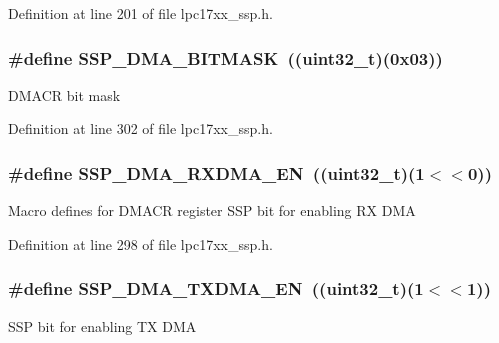 \-Definition at line 201 of file lpc17xx\-\_\-ssp.\-h.

\hypertarget{group___s_s_p___private___macros_ga7ba88e5e9bd61c60806ce262fcc8838a}{
\subsubsection[{\-S\-S\-P\-\_\-\-D\-M\-A\-\_\-\-B\-I\-T\-M\-A\-S\-K}]{\setlength{\rightskip}{0pt plus 5cm}\#define {\bf \-S\-S\-P\-\_\-\-D\-M\-A\-\_\-\-B\-I\-T\-M\-A\-S\-K}~((uint32\-\_\-t)(0x03))}}\label{group___s_s_p___private___macros_ga7ba88e5e9bd61c60806ce262fcc8838a}
\-D\-M\-A\-C\-R bit mask 

\-Definition at line 302 of file lpc17xx\-\_\-ssp.\-h.

\hypertarget{group___s_s_p___private___macros_ga0508ccc6f92325452fb24fa4d7a4c202}{
\subsubsection[{\-S\-S\-P\-\_\-\-D\-M\-A\-\_\-\-R\-X\-D\-M\-A\-\_\-\-E\-N}]{\setlength{\rightskip}{0pt plus 5cm}\#define {\bf \-S\-S\-P\-\_\-\-D\-M\-A\-\_\-\-R\-X\-D\-M\-A\-\_\-\-E\-N}~((uint32\-\_\-t)(1$<$$<$0))}}\label{group___s_s_p___private___macros_ga0508ccc6f92325452fb24fa4d7a4c202}
\-Macro defines for \-D\-M\-A\-C\-R register \-S\-S\-P bit for enabling \-R\-X \-D\-M\-A 

\-Definition at line 298 of file lpc17xx\-\_\-ssp.\-h.

\hypertarget{group___s_s_p___private___macros_gaafe065e1865ad37d436c5f000f9653ab}{
\subsubsection[{\-S\-S\-P\-\_\-\-D\-M\-A\-\_\-\-T\-X\-D\-M\-A\-\_\-\-E\-N}]{\setlength{\rightskip}{0pt plus 5cm}\#define {\bf \-S\-S\-P\-\_\-\-D\-M\-A\-\_\-\-T\-X\-D\-M\-A\-\_\-\-E\-N}~((uint32\-\_\-t)(1$<$$<$1))}}\label{group___s_s_p___private___macros_gaafe065e1865ad37d436c5f000f9653ab}
\-S\-S\-P bit for enabling \-T\-X \-D\-M\-A 

